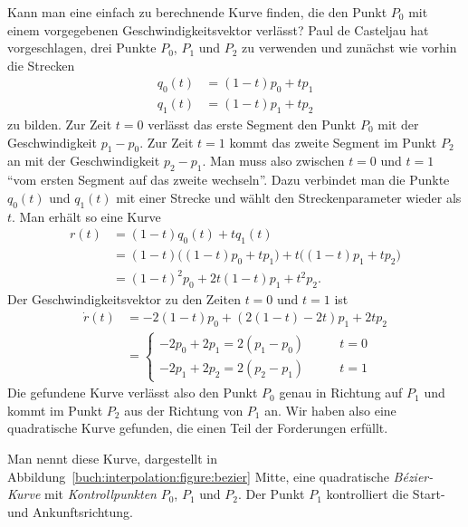 Kann man eine einfach zu berechnende Kurve finden, die den Punkt $P_0$
mit einem vorgegebenen Geschwindigkeitsvektor verlässt?
Paul de Casteljau hat vorgeschlagen, drei Punkte $P_0$, $P_1$ und $P_2$
%
zu verwenden und zunächst wie vorhin die Strecken 
\begin{align*}
q_0(t) &= (1-t) p_0 + t p_1 \\
q_1(t) &= (1-t) p_1 + t p_2 
\end{align*}
zu bilden.
Zur Zeit $t=0$ verlässt das erste Segment den Punkt $P_0$ mit der
Geschwindigkeit $p_1-p_0$.
Zur Zeit $t=1$ kommt das zweite Segment im Punkt $P_2$ an mit der
Geschwindigkeit $p_2-p_1$.
Man muss also zwischen $t=0$ und $t=1$ ``vom ersten Segment auf das zweite
wechseln''.
Dazu verbindet man die Punkte $q_0(t)$ und $q_1(t)$ mit einer Strecke und
wählt den Streckenparameter wieder als $t$.
Man erhält so eine Kurve
\begin{align*}
r(t)
&=
(1-t) q_0(t) + t q_1(t)
\\
&=
(1-t) \bigl( (1-t)p_0 + tp_1\bigr)
+
t \bigl( (1-t)p_1 + tp_2\bigr)
\\
&=
(1-t)^2 p_0 + 2t(1-t) p_1 + t^2 p_2.
\end{align*}
Der Geschwindigkeitsvektor zu den Zeiten $t=0$ und $t=1$ ist
\begin{align*}
\dot{r}(t)
&=
-2(1-t)p_0 + (2(1-t)-2t) p_1 + 2tp_2
\\
&=\begin{cases}
-2p_0+2p_1=2(p_1-p_0)&\qquad t=0
\\
-2p_1+2p_2=2(p_2-p_1)&\qquad t=1
\end{cases}
\end{align*}
Die gefundene Kurve verlässt also den Punkt $P_0$ genau in Richtung
auf $P_1$ und kommt im Punkt $P_2$ aus der Richtung von $P_1$ an.
Wir haben also eine quadratische Kurve gefunden, die einen Teil 
der Forderungen erfüllt.

Man nennt diese Kurve, dargestellt in
Abbildung~\ref{buch:interpolation:figure:bezier} Mitte,
eine quadratische {\em Bézier-Kurve} mit
%
{\em Kontrollpunkten} $P_0$, $P_1$ und $P_2$.
%
Der Punkt $P_1$ kontrolliert die Start- und Ankunftsrichtung.
%
%

